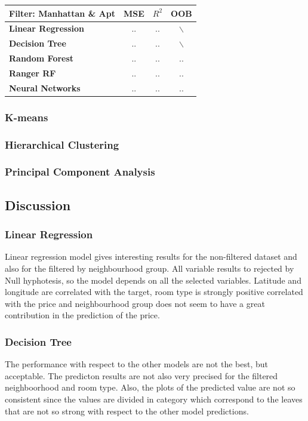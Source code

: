 \documentclass{FR16}
\begin{document}
\begin{center}
\begin{tabular}{l c c c }
\arrayrulecolor{Azzurro}
\hline
{\bfseries Filter: Manhattan \& Apt
} & MSE & $R^2$ & OOB \\
\hline
{\bfseries Linear Regression} & .. & .. & $\backslash$ \\
{\bfseries Decision Tree} & .. & .. & $\backslash$ \\
{\bfseries Random Forest} & .. & .. & .. \\
{\bfseries Ranger RF} & .. & .. & .. \\
{\bfseries Neural Networks} & .. & .. & .. \\
\hline
\end{tabular}
\end{center}
\subsubsection{K-means}


\subsubsection{Hierarchical Clustering}

\subsubsection{Principal Component Analysis}

\newpage
\subsection{Discussion}

\subsubsection{Linear Regression}
Linear regression model gives interesting results for the non-filtered dataset and also for the filtered by neighbourhood group.
All variable results to rejected by Null hyphotesis, so the model depends on all the selected variables.
Latitude and longitude are correlated with the target, room type is strongly positive correlated with the price and neighbourhood group does not seem to have
a great contribution in the prediction of the price.
\\

\subsubsection{Decision Tree}
The performance with respect to the other models are not the best, but acceptable. The predicton results are not also very precised for the filtered neighboorhood 
and room type. Also, the plots of the predicted value are not so consistent since the values are divided in category which correspond to the leaves that are not so strong
with respect to the other model predictions.
\\
\end{document}
